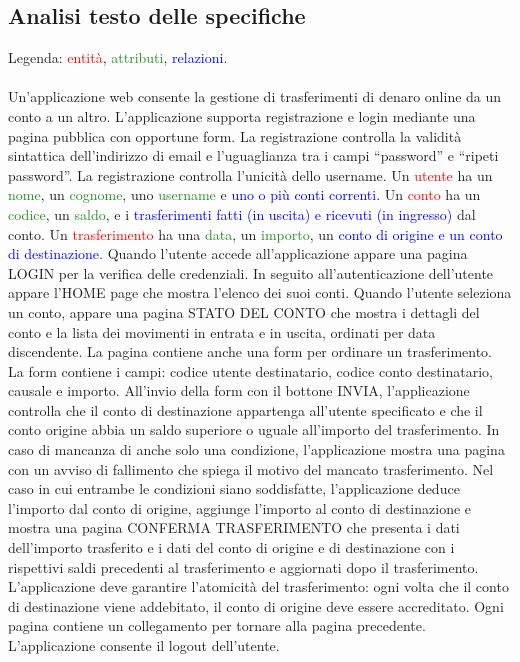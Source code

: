 \documentclass{article}
\begin{document}
\subsection{Analisi testo delle specifiche}
Legenda: \textcolor{red}{entità}, \textcolor{ForestGreen}{attributi}, \textcolor{blue}{relazioni}.
\\
\\
Un’applicazione web consente la gestione di trasferimenti di denaro online da un conto a un
altro. L’applicazione supporta registrazione e login mediante una pagina pubblica con
opportune form. La registrazione controlla la validità sintattica dell’indirizzo di email e
l’uguaglianza tra i campi “password” e “ripeti password”. La registrazione controlla l’unicità
dello username. Un \textcolor{red}{utente} ha un \textcolor{ForestGreen}{nome}, un \textcolor{ForestGreen}{cognome}, uno \textcolor{ForestGreen}{username} e \textcolor{blue}{uno o più conti correnti}.
Un \textcolor{red}{conto}  ha un \textcolor{ForestGreen}{codice}, un \textcolor{ForestGreen}{saldo}, e i \textcolor{blue}{trasferimenti fatti (in uscita) e ricevuti (in ingresso)} dal
conto. Un  \textcolor{red}{trasferimento} ha una \textcolor{ForestGreen}{data}, un \textcolor{ForestGreen}{importo}, un \textcolor{blue}{conto di origine e un conto di destinazione}.
Quando l’utente accede all’applicazione appare una pagina LOGIN per la verifica delle
credenziali. In seguito all’autenticazione dell’utente appare l’HOME page che mostra l’elenco
dei suoi conti. Quando l’utente seleziona un conto, appare una pagina STATO DEL CONTO
che mostra i dettagli del conto e la lista dei movimenti in entrata e in uscita, ordinati per data
discendente. La pagina contiene anche una form per ordinare un trasferimento. La form
contiene i campi: codice utente destinatario, codice conto destinatario, causale e importo.
All’invio della form con il bottone INVIA, l’applicazione controlla che il conto di destinazione
appartenga all’utente specificato e che il conto origine abbia un saldo superiore o uguale
all’importo del trasferimento. In caso di mancanza di anche solo una condizione, l’applicazione
mostra una pagina con un avviso di fallimento che spiega il motivo del mancato trasferimento.
Nel caso in cui entrambe le condizioni siano soddisfatte, l’applicazione deduce l’importo dal
conto di origine, aggiunge l’importo al conto di destinazione e mostra una pagina CONFERMA
TRASFERIMENTO che presenta i dati dell’importo trasferito e i dati del conto di origine e di
destinazione con i rispettivi saldi precedenti al trasferimento e aggiornati dopo il trasferimento.
L’applicazione deve garantire l’atomicità del trasferimento: ogni volta che il conto di
destinazione viene addebitato, il conto di origine deve essere accreditato. Ogni pagina
contiene un collegamento per tornare alla pagina precedente. L’applicazione consente il
logout dell’utente.
\end{document}
